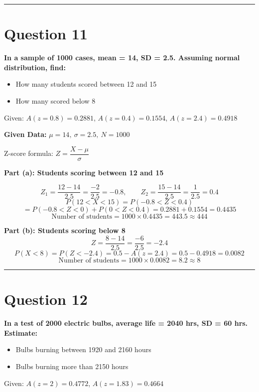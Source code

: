 \documentclass[12pt,a4paper]{article}
\begin{document}
\vspace{1em}\hrule\vspace{1em}

\section{Question 11}
\textbf{In a sample of 1000 cases, mean = 14, SD = 2.5. Assuming normal distribution, find:}
\begin{itemize}[noitemsep]
\item[(a)] How many students scored between 12 and 15
\item[(b)] How many scored below 8
\end{itemize}
Given: $A(z=0.8) = 0.2881$, $A(z=0.4) = 0.1554$, $A(z=2.4) = 0.4918$

\textbf{Given Data:} $\mu = 14,\ \sigma = 2.5,\ N = 1000$

Z-score formula: $Z = \dfrac{X - \mu}{\sigma}$

\textbf{Part (a): Students scoring between 12 and 15}

\[
Z_1 = \frac{12-14}{2.5} = \frac{-2}{2.5} = -0.8, \qquad Z_2 = \frac{15-14}{2.5} = \frac{1}{2.5} = 0.4
\]
\[
P(12 < X < 15) = P(-0.8 < Z < 0.4)
\]
\[
= P(-0.8 < Z < 0) + P(0 < Z < 0.4) = 0.2881 + 0.1554 = 0.4435
\]
\[
\text{Number of students} = 1000 \times 0.4435 = 443.5 \approx \boxed{444}
\]

\textbf{Part (b): Students scoring below 8}
\[
Z = \frac{8-14}{2.5} = \frac{-6}{2.5} = -2.4
\]
\[
P(X < 8) = P(Z < -2.4) = 0.5 - A(z=2.4) = 0.5 - 0.4918 = 0.0082
\]
\[
\text{Number of students} = 1000 \times 0.0082 = 8.2 \approx \boxed{8}
\]

\vspace{1em}\hrule\vspace{1em}

\section{Question 12}
\textbf{In a test of 2000 electric bulbs, average life = 2040 hrs, SD = 60 hrs. Estimate:}
\begin{itemize}[noitemsep]
\item[(a)] Bulbs burning between 1920 and 2160 hours
\item[(b)] Bulbs burning more than 2150 hours
\end{itemize}
Given: $A(z=2) = 0.4772$, $A(z=1.83) = 0.4664$
\end{document}
